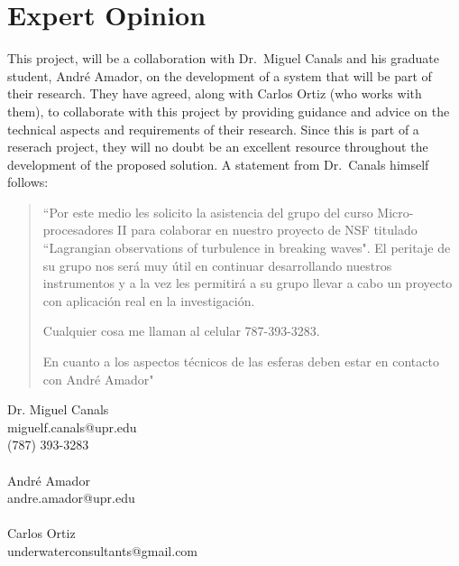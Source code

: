 \section{Expert Opinion}
This project, will be a collaboration with Dr.~Miguel Canals and his graduate student, Andr\'{e} Amador, on the development of a system that will be part of their research. They have agreed, along with Carlos Ortiz (who works with them), to collaborate with this project by providing guidance and advice on the technical aspects and requirements of their research.  Since this is part of a reserach project, they will no doubt be an excellent resource throughout the development of the proposed solution.  A statement from Dr.~Canals himself follows:

\begin{quote}
``Por este medio les solicito la asistencia del grupo del curso Micro-procesadores II para colaborar en nuestro proyecto de NSF titulado ``Lagrangian observations of turbulence in breaking waves". El peritaje de su grupo nos ser\'a muy \'util en continuar desarrollando nuestros instrumentos y a la vez les permitir\'a a su grupo llevar a cabo un proyecto con aplicaci\'on real en la investigaci\'{o}n.

Cualquier cosa me llaman al celular 787-393-3283.

En cuanto a los aspectos t\'{e}cnicos de las esferas deben estar en contacto con Andr\'{e} Amador"
\end{quote}

\begin{flushright}
Dr. Miguel Canals \\
miguelf.canals@upr.edu \\
(787) 393-3283 \\~\\

Andr\'{e} Amador \\
andre.amador@upr.edu \\~\\

Carlos Ortiz \\
underwaterconsultants@gmail.com \\
\end{flushright}